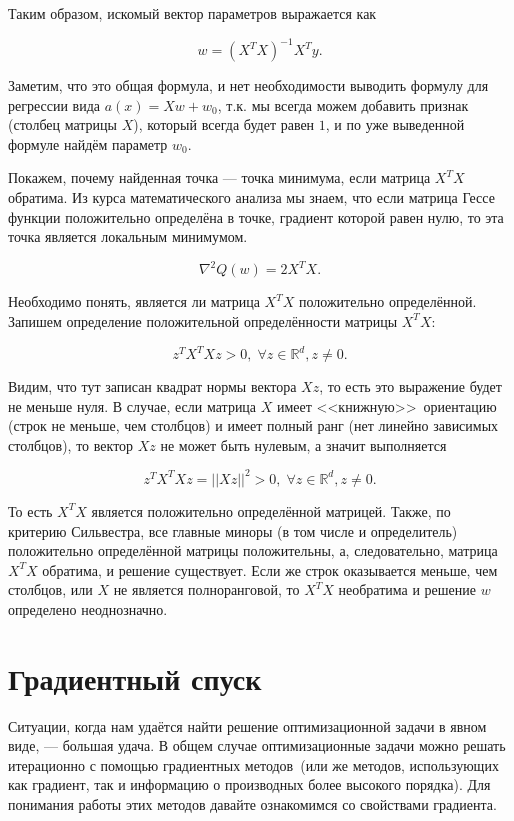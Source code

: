 \documentclass[12pt,fleqn]{article}
\begin{document}
Таким образом, искомый вектор параметров выражается как

\[
w = (X^TX)^{-1}X^Ty.
\]

Заметим, что это общая формула, и нет необходимости выводить формулу для регрессии вида $a(x) = Xw + w_0$, т.к. мы всегда можем добавить признак (столбец матрицы $X$), который всегда будет равен $1$, и по уже выведенной формуле найдём параметр $w_0$.

Покажем, почему найденная точка — точка минимума, если матрица $X^T X$ обратима. Из курса математического анализа мы знаем, что если матрица Гессе функции положительно определёна в точке, градиент которой равен нулю, то эта точка является локальным минимумом.

\[
\nabla^2 Q(w) = 2X^TX.
\]

Необходимо понять, является ли матрица $X^TX$ положительно определённой. Запишем определение положительной определённости матрицы  $X^TX$:

\[
z^TX^TXz > 0, \; \forall z \in \mathbb{R}^d, z \ne 0.
\]

Видим, что тут записан квадрат нормы вектора $Xz$, то есть это выражение будет не меньше нуля. В случае, если матрица $X$ имеет <<книжную>>\ ориентацию (строк не меньше, чем столбцов) и имеет полный ранг (нет линейно зависимых столбцов), то вектор $Xz$ не может быть нулевым, а значит выполняется

\[
z^TX^TXz = ||Xz||^2 > 0, \; \forall z \in \mathbb{R}^d, z \ne 0.
\]

То есть $X^TX$ является положительно определённой матрицей. Также, по критерию Сильвестра, все главные миноры (в том числе и определитель) положительно определённой матрицы положительны, а, следовательно, матрица $X^TX$ обратима, и решение существует. Если же строк оказывается меньше, чем столбцов, или $X$ не является полноранговой, то $X^TX$ необратима и решение $w$ определено неоднозначно. 

\section{Градиентный спуск}

Ситуации, когда нам удаётся найти решение оптимизационной задачи в явном виде, --- большая удача. В общем случае оптимизационные задачи можно решать итерационно
с помощью градиентных методов~(или же методов, использующих
как градиент, так и информацию о производных более высокого порядка). Для понимания работы этих методов давайте ознакомимся со свойствами градиента.
\end{document}
